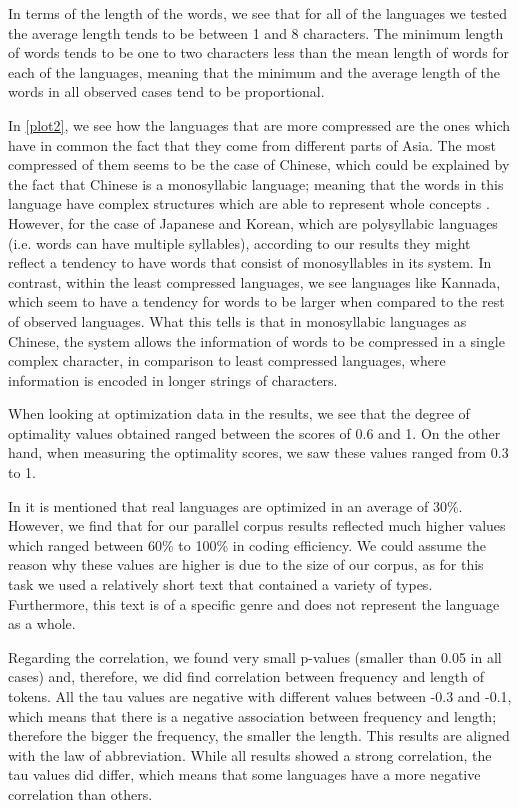 In terms of the length of the words, we see that for all of the languages we tested the average length tends to be between 1 and 8 characters. The minimum length of words tends to be one to two characters less than the mean length of words for each of the languages, meaning that the minimum and the average length of the words in all observed cases tend to be proportional.

In \cref{plot2}, we see how the languages that are more compressed are the ones which have in common the fact that they come from different parts of Asia. The most compressed of them seems to be the case of Chinese, which could be explained by the fact that Chinese is a monosyllabic language; meaning that the words in this language have complex structures which are able to represent whole concepts \cite{michaud2012monosyllabicization}. However, for the case of Japanese and Korean, which are polysyllabic languages (i.e. words can have multiple syllables), according to our results they might reflect a tendency to have words that consist of monosyllables in its system. 
In contrast, within the least compressed languages, we see languages like Kannada, which seem to have a tendency for words to be larger when compared to the rest of observed languages.  What this tells is that in monosyllabic languages as Chinese, the system allows the information of words to be compressed in a single complex character, in comparison to least compressed languages, where information is encoded in longer strings of characters. 

When looking at optimization data in the results, we see that the degree of optimality values obtained ranged between the scores of 0.6 and 1. On the other hand, when measuring the optimality scores, we saw these values ranged from 0.3 to 1. 

In \cite{FerrerICancho2018} it is mentioned that real languages are optimized in an average of 30\%. However, we find that for our parallel corpus results reflected much higher values which ranged between 60\% to 100\% in coding efficiency. We could assume the reason why these values are higher is due to the size of our corpus, as for this task we used a relatively short text that contained a variety of types. Furthermore, this text is of a specific genre and does not represent the language as a whole.

Regarding the correlation, we found very small p-values (smaller than 0.05 in all cases) and, therefore, we did find correlation between frequency and length of tokens. All the tau values are negative with different values between -0.3 and -0.1, which means that there is a negative association between frequency and length; therefore the bigger the frequency, the smaller the length. This results are aligned with the law of abbreviation. While all results showed a strong correlation, the tau values did differ, which means that some languages have a more negative correlation than others.

